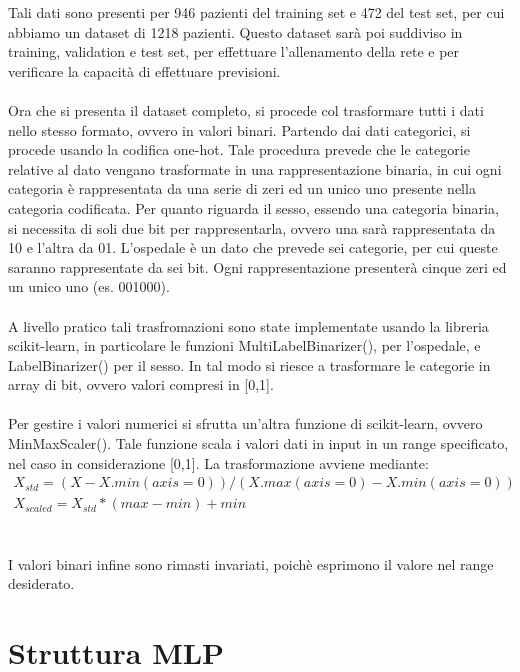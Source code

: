 Tali dati sono presenti per 946 pazienti del training set e 472 del test set, per cui abbiamo un dataset di 1218 pazienti.
Questo dataset sarà poi suddiviso in training, validation e test set, per effettuare l'allenamento della rete e per verificare la capacità di effettuare previsioni.
\\\\
Ora che si presenta il dataset completo, si procede col trasformare tutti i dati nello stesso formato, ovvero in valori binari.
Partendo dai dati categorici, si procede usando la codifica one-hot. Tale procedura prevede che le categorie relative al dato vengano 
trasformate in una rappresentazione binaria, in cui ogni categoria è rappresentata da una serie di zeri ed un unico uno presente nella categoria
codificata.
Per quanto riguarda il sesso, essendo una categoria binaria, si necessita di soli due bit per rappresentarla, ovvero
una sarà rappresentata da 10 e l'altra da 01.
L'ospedale è un dato che prevede sei categorie, per cui queste saranno rappresentate da sei bit. Ogni rappresentazione
presenterà cinque zeri ed un unico uno (es. 001000).
\\\\
A livello pratico tali trasfromazioni sono state implementate usando la libreria scikit-learn, in particolare le funzioni
MultiLabelBinarizer(), per l'ospedale, e LabelBinarizer() per il sesso. In tal modo si riesce a trasformare le categorie in array di 
bit, ovvero valori compresi in [0,1].
\\\\
Per gestire i valori numerici si sfrutta un'altra funzione di scikit-learn, ovvero MinMaxScaler().
Tale funzione scala i valori dati in input in un range specificato, nel caso in considerazione [0,1].
La trasformazione avviene mediante:
\begin{equation*}
    \begin{array}{l}
        X_{std} = (X - X.min(axis=0)) / (X.max(axis=0) - X.min(axis=0)) \\
        X_{scaled} = X_{std} * (max - min) + min
    \end{array}
\end{equation*}
\\\\
I valori binari infine sono rimasti invariati, poichè esprimono il valore nel range desiderato.

\section{Struttura MLP}

